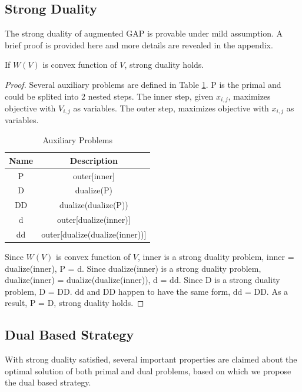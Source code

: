 \documentclass[sigconf]{acmart}
\newcommand{\sx}{x_{i,j}}
\newcommand{\sV}{V_{i,j}}
\begin{document}
\subsection{Strong Duality}

The strong duality of augmented GAP is provable under mild assumption.
A brief proof is provided here and more details are revealed in the appendix.

\begin{theorem}
If $W(V)$ is convex function of $V$, strong duality holds.
\end{theorem}

\begin{proof}
Several auxiliary problems are defined in Table \ref{TableAuxiliaryProblems}.
P is the primal and could be splited into 2 nested steps.
The inner step, given $\sx$, maximizes objective with $\sV$ as variables.
The outer step, maximizes objective with $\sx$ as variables.

\begin{table}
\caption{Auxiliary Problems\label{TableAuxiliaryProblems}}
\begin{center}
\begin{tabular}{|c|c|}
\hline
Name   & Description \\
\hline
P      & outer[inner] \\
\hline
D      & dualize(P) \\
\hline
DD     & dualize(dualize(P)) \\
\hline
d      & outer[dualize(inner)] \\
\hline
dd     & outer[dualize(dualize(inner))] \\
\hline
\end{tabular}
\end{center}
\end{table}

Since $W(V)$ is convex function of $V$, inner is a strong duality problem, inner = dualize(inner), P = d.
Since dualize(inner) is a strong duality problem, dualize(inner) = dualize(dualize(inner)), d = dd.
Since D is a strong duality problem, D = DD.
dd and DD happen to have the same form, dd = DD.
As a result, P = D, strong duality holds.
\end{proof}

\subsection{Dual Based Strategy}

With strong duality satisfied, several important properties are claimed about the optimal solution of both primal and dual problems,
    based on which we propose the dual based strategy.
\end{document}
